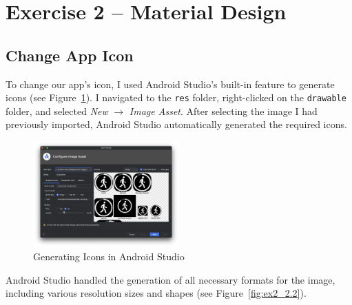 \section{Exercise 2 – Material Design}
    
    \subsection{Change App Icon}
        To change our app's icon, I used Android Studio's built-in feature to generate icons (see Figure~\ref{fig:ex2_1.1}). I navigated to the \texttt{res} folder, right-clicked on the \texttt{drawable} folder, and selected \textit{New} $\rightarrow$ \textit{Image Asset}. After selecting the image I had previously imported, Android Studio automatically generated the required icons.
        
        \begin{figure}[H]
            \centering
            \includegraphics[width=0.5\textwidth]{res/img/appIcon.png}
            \caption{Generating Icons in Android Studio}
            \label{fig:ex2_1.1}
        \end{figure}
        
        Android Studio handled the generation of all necessary formats for the image, including various resolution sizes and shapes (see Figure~\ref{fig:ex2_2.2}).
        
